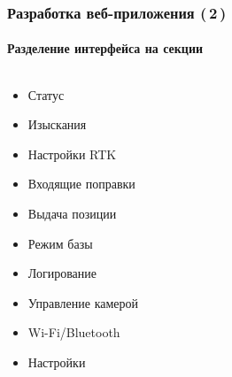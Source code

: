 \documentclass[xetex,с,aspectratio=169]{beamer}
\begin{document}

%
%
\begin{frame}
  \frametitle{Разработка веб-приложения (\,2\,)}
  \framesubtitle{Разделение интерфейса на секции}

  \begin{columns}[T]
    \begin{column}[T]{.32\textwidth}
      \begin{itemize}
        \item<1> Статус
        \item<2> Изыскания
        \item<3> Настройки RTK
        \item<4> Входящие поправки
        \item<5> Выдача позиции
        \item<6> Режим базы
        \item<7> Логирование
        \item<8> Управление камерой
        \item<9> Wi-Fi/Bluetooth
        \item<10> Настройки
      \end{itemize}
    \end{column}
    \hspace{1em}
    \begin{column}{.64\textwidth}
\end{column}
\end{columns}
\end{frame}
\end{document}

